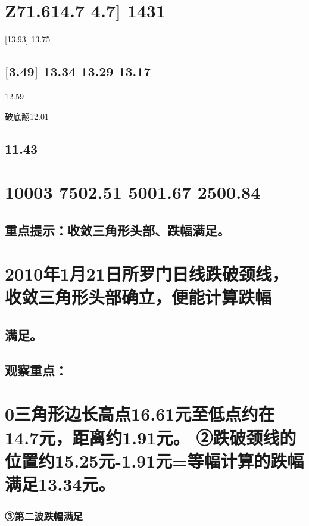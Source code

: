 \documentclass{article}
\begin{document}
\section{Z71.614.7 4.7] 1431}

[13.93] 13.75

\subsection{[3.49] 13.34 13.29 13.17}

12.59

破底翻12.01

\subsection{11.43}

\section{10003 7502.51 5001.67 2500.84}

\subsection{重点提示：收敛三角形头部、跌幅满足。}

\section{2010年1月21日所罗门日线跌破颈线，收敛三角形头部确立，便能计算跌幅}

\subsection{满足。}

\subsection{观察重点：}

\section{0三角形边长高点16.61元至低点约在14.7元，距离约1.91元。 ②跌破颈线的位置约15.25元-1.91元=等幅计算的跌幅满足13.34元。}

\subsubsection{③第二波跌幅满足}
\end{document}
